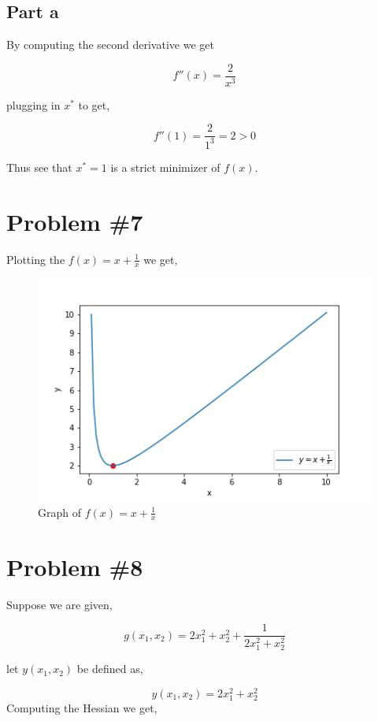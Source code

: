 \documentclass{article}
\begin{document}
\subsection*{Part a}
By computing the second derivative we get

\begin{equation*}
    f''(x) = \frac{2}{x^3}
\end{equation*}

plugging in $x^*$ to get,

\begin{equation*}
    f''(1) = \frac{2}{1^3} = 2 > 0
\end{equation*}

Thus see that $x^*=1$ is a strict minimizer of $f(x)$.

\section*{Problem \#7}
Plotting the $f(x) = x + \frac{1}{x}$ we get,
\begin{figure}[H]
    \centering
    \includegraphics[scale=0.6]{graph1.png}
    \caption{Graph of $f(x) = x + \frac{1}{x}$}
    \label{fig:my_label}
\end{figure}

\section*{Problem \#8}
Suppose we are given,

\begin{equation*}
    g(x_1,x_2) = 2x_1^2 + x_2^2 + \frac{1}{2x_1^2 + x_2^2}
\end{equation*}

let $y(x_1,x_2)$ be defined as,

\begin{equation*}
    y(x_1,x_2) = 2x_1^2 + x_2^2
\end{equation*}
Computing the Hessian we get,
\end{document}

